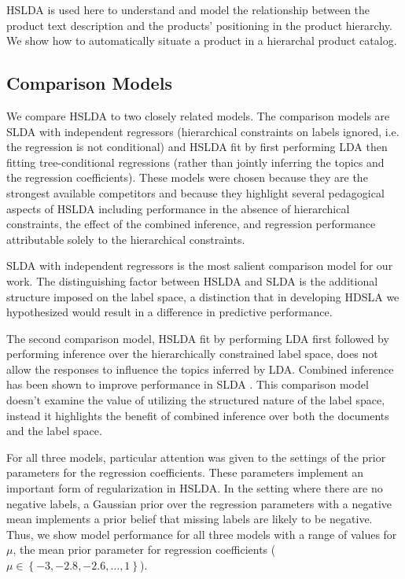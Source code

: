 HSLDA is used here to understand and model the relationship between the product text description and the products' positioning in the product hierarchy.  We show how to automatically situate a product in a hierarchal product catalog.  


\subsection{Comparison Models}

We compare HSLDA to two closely related models. The comparison models are SLDA with independent
regressors (hierarchical constraints on labels ignored,  i.e. the regression is not conditional) and HSLDA fit by first
performing LDA then fitting tree-conditional regressions (rather than jointly inferring the topics and the regression coefficients). These models were
chosen because they are the strongest available competitors and because they  highlight several pedagogical aspects of HSLDA including performance in the
absence  of hierarchical constraints, the effect of the combined inference, and
regression performance attributable solely to the hierarchical constraints.

SLDA with independent regressors is the most salient comparison model
for our work. The distinguishing factor between HSLDA and SLDA is the
additional structure imposed on the label space, a distinction that in developing HDSLA we
hypothesized would result in a difference in predictive performance. 

 The second comparison model, HSLDA fit by performing LDA first
followed by performing inference over the hierarchically constrained label
space, does not allow
the responses to influence the topics inferred by LDA.
Combined inference has been shown to improve performance in SLDA
\cite{BleiMcAuliffe2008}. This comparison model doesn't examine the value of utilizing the structured nature 
of the label space, instead it highlights the benefit of combined inference over both the
documents and the label space. 


For all three models, particular attention was given to the settings of the 
prior parameters for the regression coefficients. These parameters implement an
important form of regularization in HSLDA. In the setting where there are no
negative labels, a Gaussian prior over the regression parameters with a
negative mean implements a prior belief that missing labels are likely to be
negative. Thus, we show model performance for all three models with a
range of values for $\mu$, the mean prior parameter for regression coefficients 
($\mu\in\left\{ -3,-2.8,-2.6,\ldots,1\right\}$).

